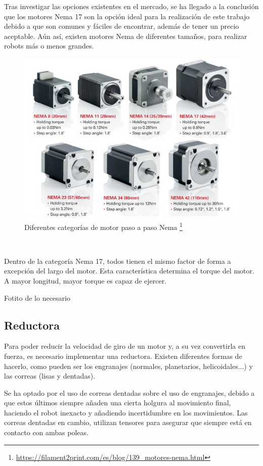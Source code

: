 Tras investigar las opciones existentes en el mercado, se ha llegado a la conclusión que los motores Nema 17 son la opción ideal 
para la realización de este trabajo debido a que son comunes y fáciles de encontrar, además de tener un precio aceptable. Aún así, 
existen motores Nema de diferentes tamaños, para realizar robots más o menos grandes.
\begin{figure} [ht!]
  \begin{center}
    \includegraphics[width=15cm]{figs/MotorsNema.png}
  \end{center}
  \caption{Diferentes categorías de motor paso a paso Nema \footnote{\url{https://filament2print.com/es/blog/139_motores-nema.html}}}
  \label{fig:nema}
\end{figure}\ 

Dentro de la categoría Nema 17, todos tienen el mismo factor de forma a excepción del largo del motor. Esta característica determina 
el torque del motor. A mayor longitud, mayor torque es capaz de ejercer. 

Fotito de lo necesario

\subsection{Reductora}
Para poder reducir la velocidad de giro de un motor y, a su vez convertirla en fuerza, es necesario implementar una reductora. 
Existen diferentes formas de hacerlo, como pueden ser los engranajes (normales, planetarios, helicoidales...) y las correas (lisas y 
dentadas).

Se ha optado por el uso de correas dentadas sobre el uso de engranajes, debido a que estos últimos siempre añaden una cierta holgura 
al movimiento final, haciendo el robot inexacto y añadiendo incertidumbre en los movimientos. Las correas dentadas en cambio, utilizan 
tensores para asegurar que siempre está en contacto con ambas poleas.


